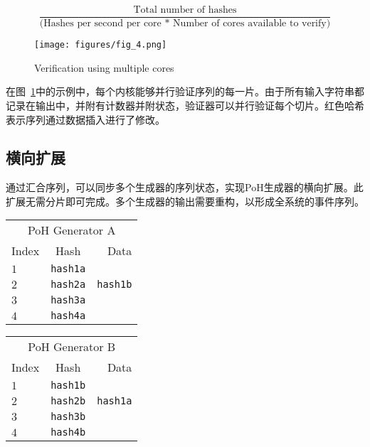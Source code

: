 \documentclass[12pt, uft8]{ctexart}
\begin{document}
\[
\frac{\textrm{Total number of hashes}}{\textrm{(Hashes per second per core * Number of cores available to verify)}}
\]

\begin{figure}
  \begin{center}
    \centering
    \texttt{[image: figures/fig\_4.png]}
    \caption[Figure 4]{Verification using multiple cores\label{fig:poh_verify}}
  \end{center}
  \end{figure}

在图~\ref{fig:poh_verify}中的示例中，每个内核能够并行验证序列的每一片。由于所有输入字符串都记录在输出中，并附有计数器并附状态，验证器可以并行验证每个切片。红色哈希表示序列通过数据插入进行了修改。

\subsection{横向扩展}\label{poh:scale}
通过汇合序列，可以同步多个生成器的序列状态，实现PoH生成器的横向扩展。此扩展无需分片即可完成。多个生成器的输出需要重构，以形成全系统的事件序列。

\begin{center}
  \begin{tabular}{|l c r|}

  \hline
    \multicolumn{3}{|c|}{PoH Generator A} \\
    Index & Hash & Data \\ \hline
    $1$ & \texttt{hash1a} & \\
    $2$ & \texttt{hash2a} & \texttt{hash1b} \\
    $3$ & \texttt{hash3a} & \\
    $4$ & \texttt{hash4a} & \\
    \hline
    \end{tabular}
  \begin{tabular}{| l  c  r |}
  \hline
    \multicolumn{3}{|c|}{PoH Generator B} \\
    Index & Hash & Data \\ \hline
    $1$ & \texttt{hash1b} & \\
    $2$ & \texttt{hash2b} & \texttt{hash1a} \\
    $3$ & \texttt{hash3b} & \\
    $4$ & \texttt{hash4b} & \\
    \hline
    \end{tabular}
\end{center}
\end{document}

